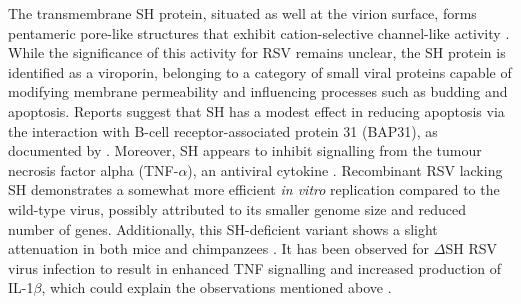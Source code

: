 The transmembrane SH protein, situated as well at the virion surface, forms pentameric pore-like structures that exhibit cation-selective channel-like activity \cite{Carter2010DirectPermeability, Gan2012TheChannels}. While the significance of this activity for RSV remains unclear, the SH protein is identified as a viroporin, belonging to a category of small viral proteins capable of modifying membrane permeability and influencing processes such as budding and apoptosis. Reports suggest that SH has a modest effect in reducing apoptosis via the interaction with B-cell receptor-associated protein 31 (BAP31), as documented by \cite{Fuentes2007FunctionProtein}. Moreover, SH appears to inhibit signalling from the tumour necrosis factor alpha (TNF-\(\alpha\)), an antiviral cytokine \cite{Fuentes2007FunctionProtein}. Recombinant RSV lacking SH demonstrates a somewhat more efficient \textit{in vitro} replication compared to the wild-type virus, possibly attributed to its smaller genome size and reduced number of genes. Additionally, this SH-deficient variant shows a slight attenuation in both mice and chimpanzees \cite{Whitehead1999RecombinantChimpanzees}. It has been observed for \(\Delta\)SH RSV virus infection to result in enhanced TNF signalling and increased production of IL-1\(\beta\), which could explain the observations mentioned above \cite{Pollock2017ModulationProtein}. 

